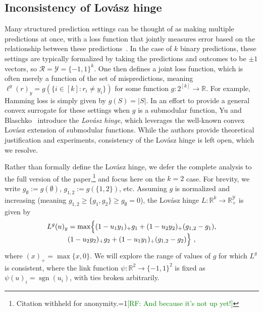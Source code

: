 \documentclass[12pt]{article}
\newcommand{\Comments}{1}
\newcommand{\mynote}[2]{\ifnum\Comments=1\textcolor{#1}{#2}\fi}
\newcommand{\mytodo}[2]{\ifnum\Comments=1%
  \todo[linecolor=#1!80!black,backgroundcolor=#1,bordercolor=#1!80!black]{#2}\fi}
\newcommand{\raf}[1]{\mynote{green}{[RF: #1]}}
\newcommand{\raft}[1]{\mytodo{green!20!white}{RF: #1}}
\newcommand{\reals}{\mathbb{R}}
\newcommand{\R}{\mathcal{R}}
\newcommand{\Y}{\mathcal{Y}}
\newcommand{\elltopk}{\ell_{\text{top-$k$}}}
\DeclareMathOperator*{\sgn}{sgn}
\begin{document}


\subsection{Inconsistency of Lov\'asz hinge}
\label{sec:lovasz-hinge}

Many structured prediction settings can be thought of as making multiple predictions at once, with a loss function that jointly measures error based on the relationship between these predictions~\cite{hazan2010direct, gao2011consistency, osokin2017structured}.
In the case of $k$ binary predictions, these settings are typically formalized by taking the predictions and outcomes to be $\pm 1$ vectors, so $\R=\Y=\{-1,1\}^k$.
One then defines a joint loss function, which is often merely a function of the set of mispredictions, meaning $\ell^g(r)_y = g(\{i \in [k] : r_i \neq y_i\})$ for some function $g:2^{[k]}\to\reals$.
For example, Hamming loss is simply given by $g(S) = |S|$.
In an effort to provide a general convex surrogate for these settings when $g$ is a submodular function, Yu and Blaschko~\cite{yu2018lovasz} introduce the \emph{Lov\'asz hinge}, which leverages the well-known convex Lov\'asz extension of submodular functions.
While the authors provide theoretical justification and experiments, consistency of the Lov\'asz hinge is left open, which we resolve.

Rather than formally define the Lov\'asz hinge, we defer the complete analysis to the full version of the paper,\footnote{Citation withheld for anonymity.\raf{And because it's not up yet!}} and focus here on the $k=2$ case.
For brevity, we write $g_\emptyset := g(\emptyset)$, $g_{1,2} := g(\{1,2\})$, etc.
Assuming $g$ is normalized and increasing (meaning $g_{1,2} \geq \{g_1,g_2\} \geq g_\emptyset = 0$), the Lov\'asz hinge $L:\reals^k\to\reals^\Y_+$ is given by
\begin{multline}
  \label{eq:lovasz-hinge}
  L^g(u)_y = \max\Bigl\{(1-u_1y_1)_+ g_1 + (1-u_2y_2)_+ (g_{1,2}-g_1),\\[-4pt] (1-u_2y_2)_+ g_2 + (1-u_1y_1)_+ (g_{1,2}-g_2)\Bigr\}~,
\end{multline}
where $(x)_+ = \max\{x,0\}$.
We will explore the range of values of $g$ for which $L^g$ is consistent, where the link function $\psi:\reals^2\to\{-1,1\}^2$ is fixed as $\psi(u)_i = \sgn(u_i)$, with ties broken arbitrarily.
\end{document}
